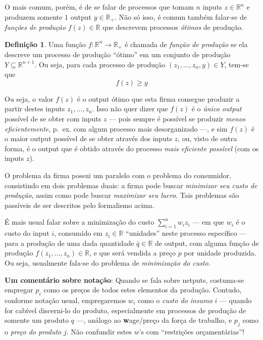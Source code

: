 \documentclass[12pt]{article}
\numberwithin{equation}{section}
\theoremstyle{plain}
\theoremstyle{definition}
\newtheorem{definition}[theorem]{Definição}
\theoremstyle{remark}
\begin{document}
O mais comum, porém, é de se falar de processos que tomam \(n\) inputs \(z \in \mathbb{R}^{n}\) e produzem somente \(1\) output \(y \in \mathbb{R}_{+}\). Não só isso, é comum também falar-se de \textit{funções de produção} \(f(z) \in \mathbb{R}\) que descrevem processos \textit{ótimos} de produção.

\begin{definition}
Uma função \(f: \mathbb{R}^{n} \to \mathbb{R}_{+}\) é chamada de
\textit{função de produção} se ela descreve um processo de produção
``ótimo'' em um conjunto de produção \(Y \subseteq \mathbb{R}^{n+1}\).
Ou seja, para cada processo de produção
\((z_{1}, \dots, z_{n}, y) \in Y\), tem-se que
\[
f(z) \geq y
\]

Ou seja, o valor \(f(z)\) é o output ótimo que esta firma consegue
produzir a partir destes inputs \(z_{1},\dots,z_{n}\). Isso não quer
dizer que \(f(z)\) é o \textit{único output} possível de se obter com
inputs \(z\) --- pois sempre é possível se produzir \textit{menos
eficientemente}, p.~ex. com algum processo mais desorganizado ---, e sim
\(f(z)\) é o maior output possível de se obter através dos inputs \(z\),
ou, visto de outra forma, é o output que é obtido através do processo
\textit{mais eficiente possível} (com os inputs \(z\)).
\end{definition}

O problema da firma possui um paralelo com o problema do consumidor, consistindo em dois problemas duais: a firma pode buscar \textit{minimizar seu custo de produção}, assim como pode buscar \textit{maximizar seu lucro}. Tais problemas são passíveis de ser descritos pelo formalismo acima.

É mais usual falar sobre a minimização do custo \(\sum \limits_{i=1}^{n} w_{i}z_{i}\) --- em que \(w_{i}\) é o custo do input \(i\), consumido em \(z_{i} \in \mathbb{R}\) ``unidades'' neste processo específico --- para a produção de uma dada quantidade \(\bar{q} \in \mathbb{R}\) de output, com alguma função de produção \(f(z_{1},\dots,z_{n}) \in \mathbb{R}\), e que será vendida a preço \(p\) por unidade produzida. Ou seja, usualmente fala-se do problema de \textit{minimização do custo}.

\textbf{Um comentário sobre notação}: Quando se fala sobre netputs, costuma-se empregar $p_i$ como os preços de todos estes elementos da produção. Contudo, conforme notação usual, empregaremos \(w_{i}\) como o \textit{custo do insumo} \(i\) --- quando for cabível discerni-lo do produto, especialmente em processos de produção de somente um produto $q$ ---, análogo ao \textbf{w}age/preço da força de trabalho, e \(p_{j}\) como o \textit{preço do produto} \(j\). Não confundir estes \(w\)'s com ``restrições orçamentárias''!
\end{document}
